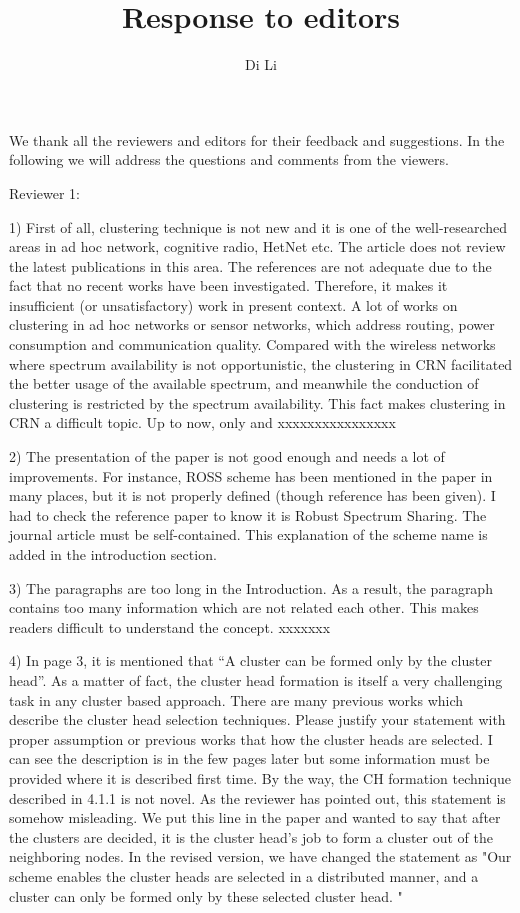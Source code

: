 \documentclass[10pt,a4paper]{article}
\author{Di Li}
\title{Response to editors}
\begin{document}
We thank all the reviewers and editors for their feedback and suggestions.
In the following we will address the questions and comments from the viewers.

Reviewer 1:

 1)  First of all, clustering technique is not new and it is one of the well-researched areas in ad hoc network, cognitive radio, HetNet etc. The article does not review the latest publications in this area. The references are not adequate due to the fact that no recent works have been investigated. Therefore, it makes it insufficient (or unsatisfactory) work in present context.
A lot of works on clustering in ad hoc networks or sensor networks, which address routing, power consumption and communication quality.
Compared with the wireless networks where spectrum availability is not opportunistic, the clustering in CRN facilitated the better usage of the available spectrum, and meanwhile the conduction of clustering is restricted by the spectrum availability.
This fact makes clustering in CRN a difficult topic.
Up to now, only \cite{LIU_TMC11_2, Li11_ROSS, mansoor_15_cluster_robust} and \cite{Mansoor2015} xxxxxxxxxxxxxxxx

 
 
    2)  The presentation of the paper is not good enough and needs a lot of improvements. For instance, ROSS scheme has been mentioned in the paper in many places, but it is not properly defined (though reference has been given). I had to check the reference paper to know it is Robust Spectrum Sharing. The journal article must be self-contained.
    This explanation of the scheme name is added in the introduction section.
    
    3)  The paragraphs are too long in the Introduction. As a result, the paragraph contains too many information which are not related each other. This makes readers difficult to understand the concept.
    xxxxxxx
    
    4)   In page 3, it is mentioned that “A cluster can be formed only by the cluster head”. As a matter of fact, the cluster head formation is itself a very challenging task in any cluster based approach. There are many previous works which describe the cluster head selection techniques. Please justify your statement with proper assumption or previous works that how the cluster heads are selected. I can see the description is in the few pages later but some information must be provided where it is described first time. By the way, the CH formation technique described in 4.1.1 is not novel.
	    As the reviewer has pointed out, this statement is somehow misleading. 
	    We put this line in the paper and wanted to say that after the clusters are decided, it is the cluster head's job to form a cluster out of the neighboring nodes.
In the revised version, we have changed the statement as "Our scheme enables the cluster heads are selected in a distributed manner, and a cluster can only be formed only by these selected cluster head. "
    
\end{document}
